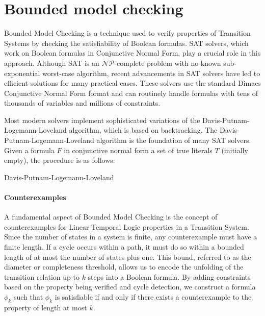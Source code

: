 \section{Bounded model checking}

Bounded Model Checking is a technique used to verify properties of Transition Systems by checking the satisfiability of Boolean formulas. 
SAT solvers, which work on Boolean formulas in Conjunctive Normal Form, play a crucial role in this approach. 
Although SAT is an $\mathcal{NP}$-complete problem with no known sub-exponential worst-case algorithm, recent advancements in SAT solvers have led to efficient solutions for many practical cases. 
These solvers use the standard Dimacs Conjunctive Normal Form format and can routinely handle formulas with tens of thousands of variables and millions of constraints. 

Most modern solvers implement sophisticated variations of the Davis-Putnam-Logemann-Loveland algorithm, which is based on backtracking.
The Davis-Putnam-Logemann-Loveland algorithm is the foundation of many SAT solvers.
Given a formula $F$ in conjunctive normal form a set of true literals $T$ (initially empty), the procedure is as follows:
\begin{algorithm}[H]
    \caption{Davis-Putnam-Logemann-Loveland}
\end{algorithm}

\paragraph*{Counterexamples}
A fundamental aspect of Bounded Model Checking is the concept of counterexamples for Linear Temporal Logic properties in a Transition System. 
Since the number of states in a system is finite, any counterexample must have a finite length.
If a cycle occurs within a path, it must do so within a bounded length of at most the number of states plus one. 
This bound, referred to as the diameter or completeness threshold, allows us to encode the unfolding of the transition relation up to $k$ steps into a Boolean formula. 
By adding constraints based on the property being verified and cycle detection, we construct a formula $\phi_k$ such that $\phi_k$ is satisfiable if and only if there exists a counterexample to the property of length at most $k$.

